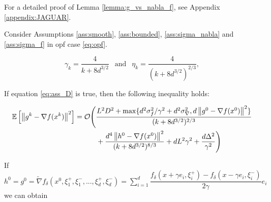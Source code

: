         For a detailed proof of Lemma \ref{lemma:g_vs_nabla_f}, see Appendix \ref{appendix:JAGUAR}. 
    
        \begin{theorem}
        \label{theorem:JAGUAR}
            Consider Assumptions \ref{ass:smooth}, \ref{ass:bounded}, \ref{ass:sigma_nabla} and \ref{ass:sigma_f} in opf case \eqref{eq:opf}.
            
            $$\gamma_k = \frac{4}{k + 8d^{3/2}} ~~\text{ and }~~ \eta_k = \frac{4}{(k + 8d^{3/2})^{2/3}},$$
            
            If equation \eqref{eq:ass_D} is true, then the following inequality holds:
    
    

            \begin{equation*}
            \begin{split}
                \mathbb{E}\left[ \left\| g^k - \nabla f(x^k) \right\|^2 \right] 
                &=
                \mathcal{O} \Bigg(\frac{L^2 D^2 + \max\{d^2 \sigma_f^2/ \gamma^2 + d^2 \sigma_{\nabla}^2, d \left\| g^0 - \nabla f(x^0) \right\|^2\}}{(k + 8d^{3/2})^{2/3}}
                \\&\qquad\quad+
                \frac{d^4 \left\| h^0 - \nabla f(x^0) \right\|^2}{(k + 8d^{3/2})^{8/3}}
                +
                d L^2 \gamma^2 + \frac{d \Delta^2}{\gamma^2} \Bigg)
            \end{split}
            \end{equation*}

            If $h^0 = g^0 = \widetilde{\nabla} f_\delta(x^0, \xi^+_1, \xi^-_1, ..., \xi^+_d, \xi^-_d) = \sum_{i=1}^d \dfrac{f_{\delta}(x + \gamma e_i, \xi_i^+) - f_{\delta}(x - \gamma e_i, \xi_i^-)}{2 \gamma} e_i$ we can obtain
    

\end{theorem}
